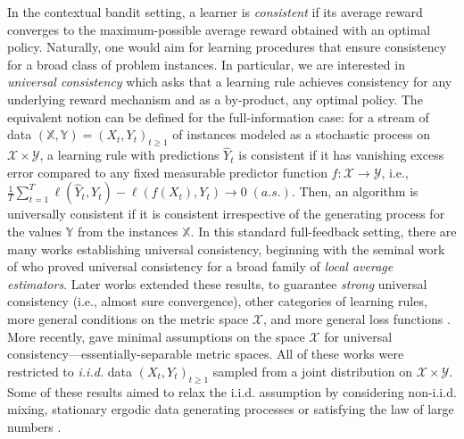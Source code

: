 \documentclass[aos]{imsart}
\theoremstyle{plain}
\theoremstyle{remark}
\newcommand{\Xcal}{\mathcal{X}}
\newcommand{\Ycal}{\mathcal{Y}}
\newcommand{\Xbb}{\mathbb{X}}
\newcommand{\Ybb}{\mathbb{Y}}
\newcommand{\1}{\mathbbm{1}}%
\newcommand{\X}{\mathcal X}
\begin{document}
In the contextual bandit setting, a learner is \emph{consistent} if its average reward converges to the maximum-possible average reward obtained with an optimal policy. Naturally, one would aim for learning procedures that ensure consistency for a broad class of problem instances. In particular, we are interested in \emph{universal consistency} which asks that a learning rule achieves consistency for any underlying reward mechanism and as a by-product, any optimal policy. The equivalent notion can be defined for the full-information case: for a stream of data $(\Xbb,\Ybb)=(X_t,Y_t)_{t\geq 1}$ of instances modeled as a stochastic process on $\Xcal\times \Ycal$, a learning rule with predictions $\hat Y_t$ is consistent if it has vanishing excess error compared to any fixed measurable predictor function $f:\Xcal\to\Ycal$, i.e., $\frac{1}{T}\sum_{t=1}^T \ell(\hat Y_t,Y_t)-\ell(f(X_t),Y_t)\to 0\;(a.s.).$ Then, an algorithm is universally consistent if it is consistent irrespective of the generating process for the values $\Ybb$ from the instances $\Xbb$.
In this standard full-feedback setting, there are many works establishing universal consistency, beginning with the seminal work of \citep*{stone:77} who proved universal consistency for a broad family of \emph{local average estimators}.
Later works extended these results, to guarantee \emph{strong} universal consistency (i.e., almost sure convergence), other categories of learning rules, more general conditions on the metric space $\X$, and more general loss functions
\cite{devroye:96,gyorfi:02}. More recently, \cite{hanneke:21b,gyorfi2021universal,cohen:22} gave minimal assumptions on the space $\X$ for universal consistency---essentially-separable metric spaces. All of these works were restricted to \emph{i.i.d.} data $(X_t,Y_t)_{t\geq 1}$ sampled from a joint distribution on $\Xcal\times \Ycal$. Some of these results aimed to relax the i.i.d. assumption by considering non-i.i.d. mixing, stationary ergodic data generating processes \cite{morvai:96,gyorfi:99,gyorfi:02} or satisfying the law of large numbers \cite{morvai:99,gray:09,steinwart:09}.
\end{document}
